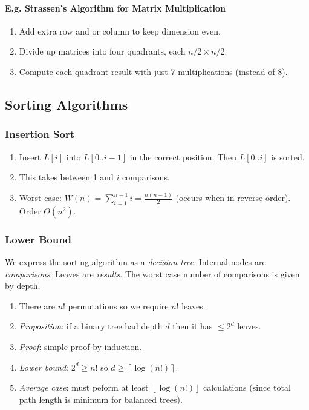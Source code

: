 \documentclass[twocolumn,english]{article}
\begin{document}
\paragraph{E.g. Strassen's Algorithm for Matrix Multiplication}
\begin{enumerate}
\item Add extra row and or column to keep dimension even.
\item Divide up matrices into four quadrants, each $n/2\times n/2$.
\item Compute each quadrant result with just 7 multiplications (instead
of 8).
\end{enumerate}

\subsection{Sorting Algorithms}


\subsubsection{Insertion Sort}
\begin{enumerate}
\item Insert $L\left[i\right]$ into $L\left[0..i-1\right]$ in the correct
position. Then $L\left[0..i\right]$ is sorted.
\item This takes between 1 and $i$ comparisons.
\item Worst case: $W\left(n\right)=\sum_{i=1}^{n-1}i=\frac{n(n-1)}{2}$
(occurs when in reverse order). Order $\Theta\left(n^{2}\right)$.
\end{enumerate}

\subsubsection{Lower Bound}

We express the sorting algorithm as a \emph{decision tree}. Internal
nodes are \emph{comparisons}. Leaves are \emph{results}. The worst
case number of comparisons is given by depth.
\begin{enumerate}
\item There are $n!$ permutations so we require $n!$ leaves.
\item \emph{Proposition}: if a binary tree had depth $d$ then it has $\leq2^{d}$
leaves.
\item \emph{Proof}: simple proof by induction.
\item \emph{Lower bound}: $2^{d}\geq n!$ so $d\geq\left\lceil \log\left(n!\right)\right\rceil $.
\item \emph{Average case}: must peform at least $\left\lfloor \log\left(n!\right)\right\rfloor $
calculations (since total path length is minimum for balanced trees).\end{enumerate}
\end{document}
